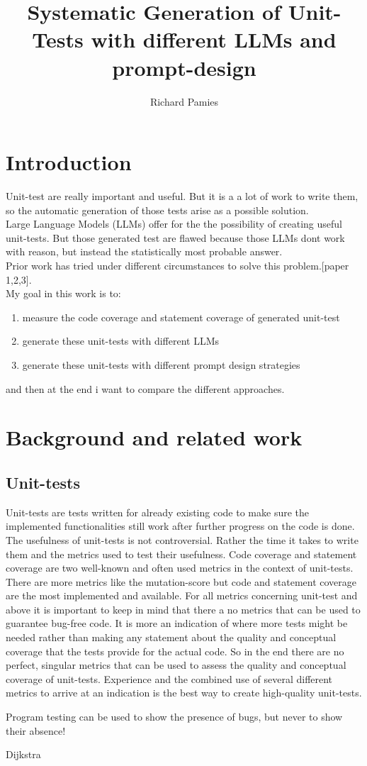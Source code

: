 \documentclass[a4paper,11pt,oneside]{memoir}
\title{Systematic Generation of Unit-Tests with different LLMs and prompt-design}
\author{Richard Pamies}
\begin{document}
\frontmatter

\smarttitle

\newpage
\tableofcontents

\mainmatter

\chapter{Introduction}
Unit-test are really important and useful. But it is a a lot of work to write them, so the automatic generation of those tests arise as a possible solution.
\\
Large Language Models (LLMs) offer for the the possibility of creating useful unit-tests. But those generated test are flawed because those LLMs dont work with reason, but instead the statistically most probable answer.
\\
Prior work  has tried under different circumstances to solve this problem.[paper 1,2,3].
\\
My goal in this work is to:
\begin{enumerate}
\item measure the code coverage and statement coverage of generated unit-test
\item generate these unit-tests with different LLMs
\item generate these unit-tests with different prompt design strategies
\end{enumerate}
and then at the end i want to compare the different approaches.

\chapter{Background and related work}
\section{Unit-tests}
Unit-tests are tests written for already existing code to make sure the implemented functionalities still work after further progress on the code is done. The usefulness of unit-tests is not controversial. Rather the time it takes to write them and the metrics used to test their usefulness. 
Code coverage and statement coverage are two well-known and often used metrics in the context of unit-tests. There are more metrics like the mutation-score but code and statement coverage are the most implemented and available.
For all metrics concerning unit-test and above it is important to keep in mind that there a no metrics that can be used to guarantee bug-free code. It is more an indication of where more tests might be needed rather than making any statement about the quality and conceptual coverage that the tests provide for the actual code.
So in the end there are no perfect, singular metrics that can be used to assess the quality and conceptual coverage of unit-tests. Experience and the combined use of several different metrics to arrive at an indication is the best way to create high-quality unit-tests.
\epigraph{Program testing can be used to show the presence of bugs, but never to show their absence!}{Dijkstra }
\end{document}

